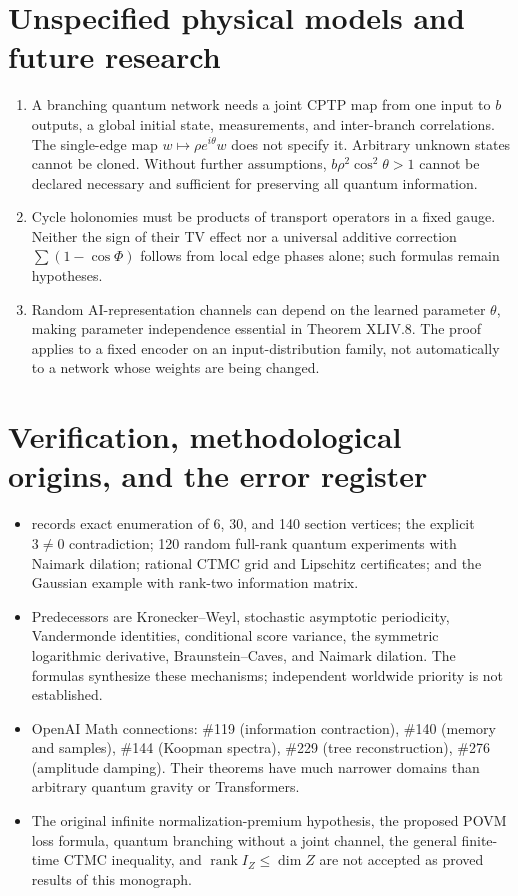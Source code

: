 \documentclass[11pt,a4paper,oneside]{book}
\DeclareMathOperator{\rank}{rank}\DeclareMathOperator{\Tr}{Tr}
\begin{document}
\section{Unspecified physical models and future research}
\begin{enumerate}
\item A branching quantum network needs a joint CPTP map from one input to $b$ outputs, a global initial state, measurements, and inter-branch correlations. The single-edge map $w\mapsto\rho e^{i\theta}w$ does not specify it. Arbitrary unknown states cannot be cloned. Without further assumptions, $b\rho^2\cos^2\theta>1$ cannot be declared necessary and sufficient for preserving all quantum information.
\item Cycle holonomies must be products of transport operators in a fixed gauge. Neither the sign of their TV effect nor a universal additive correction $\sum(1-\cos\Phi)$ follows from local edge phases alone; such formulas remain hypotheses.
\item Random AI-representation channels can depend on the learned parameter $\theta$, making parameter independence essential in Theorem XLIV.8. The proof applies to a fixed encoder on an input-distribution family, not automatically to a network whose weights are being changed.
\end{enumerate}
\section{Verification, methodological origins, and the error register}
\begin{itemize}
\item {} records exact enumeration of 6, 30, and 140 section vertices; the explicit $3\ne0$ contradiction; 120 random full-rank quantum experiments with Naimark dilation; rational CTMC grid and Lipschitz certificates; and the Gaussian example with rank-two information matrix.
\item Predecessors are Kronecker--Weyl, stochastic asymptotic periodicity, Vandermonde identities, conditional score variance, the symmetric logarithmic derivative, Braunstein--Caves, and Naimark dilation. The formulas synthesize these mechanisms; independent worldwide priority is not established.
\item OpenAI Math connections: \#119 (information contraction), \#140 (memory and samples), \#144 (Koopman spectra), \#229 (tree reconstruction), \#276 (amplitude damping). Their theorems have much narrower domains than arbitrary quantum gravity or Transformers.
\item The original infinite normalization-premium hypothesis, the proposed POVM loss formula, quantum branching without a joint channel, the general finite-time CTMC inequality, and $\rank I_Z\le\dim Z$ are not accepted as proved results of this monograph.
\end{itemize}
\end{document}
